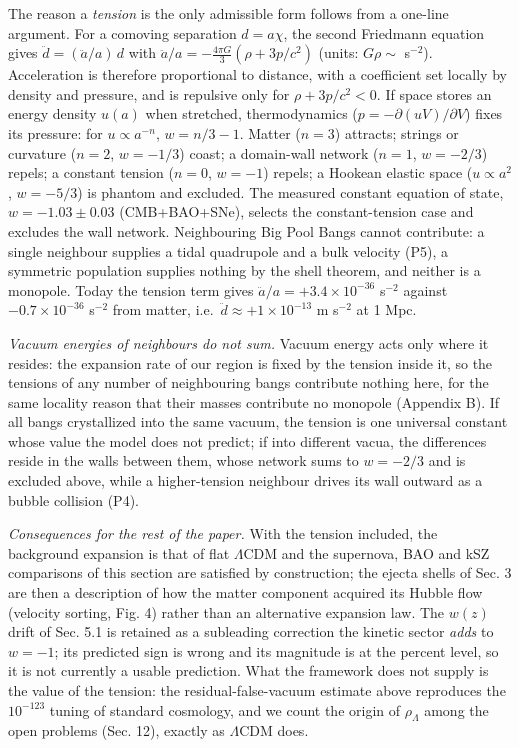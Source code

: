 \documentclass[
]{article}
\begin{document}
The reason a \emph{tension} is the only admissible form follows from a
one-line argument. For a comoving separation \(d = a\chi\), the second
Friedmann equation gives \(\ddot d = (\ddot a/a)\,d\) with
\(\ddot a/a = -\tfrac{4\pi G}{3}(\rho + 3p/c^2)\) (units: \(G\rho \sim\)
s\(^{-2}\)). Acceleration is therefore proportional to distance, with a
coefficient set locally by density and pressure, and is repulsive only
for \(\rho + 3p/c^2 < 0\). If space stores an energy density \(u(a)\)
when stretched, thermodynamics (\(p = -\partial(uV)/\partial V\)) fixes
its pressure: for \(u \propto a^{-n}\), \(w = n/3 - 1\). Matter
(\(n=3\)) attracts; strings or curvature (\(n=2\), \(w=-1/3\)) coast; a
domain-wall network (\(n=1\), \(w=-2/3\)) repels; a constant tension
(\(n=0\), \(w=-1\)) repels; a Hookean elastic space
(\(u \propto a^{2}\), \(w=-5/3\)) is phantom and excluded. The measured
constant equation of state, \(w = -1.03 \pm 0.03\) (CMB+BAO+SNe),
selects the constant-tension case and excludes the wall network.
Neighbouring Big Pool Bangs cannot contribute: a single neighbour
supplies a tidal quadrupole and a bulk velocity (P5), a symmetric
population supplies nothing by the shell theorem, and neither is a
monopole. Today the tension term gives
\(\ddot a/a = +3.4\times10^{-36}\) s\(^{-2}\) against
\(-0.7\times10^{-36}\) s\(^{-2}\) from matter,
i.e.~\(\ddot d \approx +1\times10^{-13}\) m s\(^{-2}\) at 1 Mpc.

\emph{Vacuum energies of neighbours do not sum.} Vacuum energy acts only
where it resides: the expansion rate of our region is fixed by the
tension inside it, so the tensions of any number of neighbouring bangs
contribute nothing here, for the same locality reason that their masses
contribute no monopole (Appendix B). If all bangs crystallized into the
same vacuum, the tension is one universal constant whose value the model
does not predict; if into different vacua, the differences reside in the
walls between them, whose network sums to \(w = -2/3\) and is excluded
above, while a higher-tension neighbour drives its wall outward as a
bubble collision (P4).

\emph{Consequences for the rest of the paper.} With the tension
included, the background expansion is that of flat \(\Lambda\)CDM and
the supernova, BAO and kSZ comparisons of this section are satisfied by
construction; the ejecta shells of Sec. 3 are then a description of how
the matter component acquired its Hubble flow (velocity sorting, Fig. 4)
rather than an alternative expansion law. The \(w(z)\) drift of Sec. 5.1
is retained as a subleading correction the kinetic sector \emph{adds} to
\(w=-1\); its predicted sign is wrong and its magnitude is at the
percent level, so it is not currently a usable prediction. What the
framework does not supply is the value of the tension: the
residual-false-vacuum estimate above reproduces the \(10^{-123}\) tuning
of standard cosmology, and we count the origin of \(\rho_\Lambda\) among
the open problems (Sec. 12), exactly as \(\Lambda\)CDM does.
\end{document}
